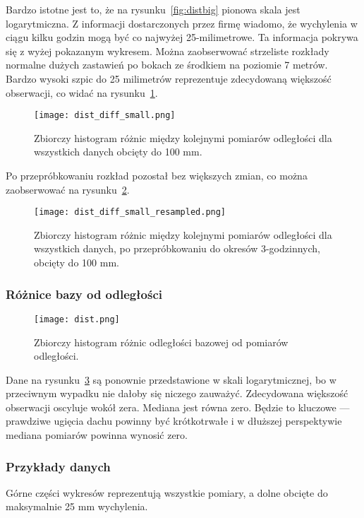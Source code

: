 Bardzo istotne jest to, że na rysunku~\ref{fig:distbig} pionowa skala jest logarytmiczna.
Z informacji dostarczonych przez firmę wiadomo, że wychylenia w ciągu kilku godzin mogą być co najwyżej 25-milimetrowe.
Ta informacja pokrywa się z wyżej pokazanym wykresem.
Można zaobserwować strzeliste rozkłady normalne dużych zastawień po bokach ze środkiem na poziomie 7 metrów.
Bardzo wysoki szpic do 25 milimetrów reprezentuje zdecydowaną większość obserwacji, co widać na rysunku~\ref{fig:diffsmall}.


\begin{figure}[h]
    \texttt{[image: dist\_diff\_small.png]}
    \caption{Zbiorczy histogram różnic między kolejnymi pomiarów odległości dla wszystkich danych obcięty do 100 mm.}
    \label{fig:diffsmall}
\end{figure}


Po przepróbkowaniu rozkład pozostał bez większych zmian, co można zaobserwować na rysunku~\ref{fig:diffsmallresampled}.
\begin{figure}[h]
    \texttt{[image: dist\_diff\_small\_resampled.png]}
    \caption{Zbiorczy histogram różnic między kolejnymi pomiarów odległości dla wszystkich danych, po przepróbkowaniu do okresów 3-godzinnych, obcięty do 100 mm.}
    \label{fig:diffsmallresampled}
\end{figure}


\subsubsection{Różnice bazy od odległości}
\begin{figure}[h]
    \texttt{[image: dist.png]}
    \caption{Zbiorczy histogram różnic odległości bazowej od pomiarów odległości.}
    \label{fig:dist}
\end{figure}


Dane na rysunku~\ref{fig:dist} są ponownie przedstawione w skali logarytmicznej, bo w przeciwnym wypadku nie dałoby się niczego zauważyć.
Zdecydowana większość obserwacji oscyluje wokół zera.
Mediana jest równa zero.
Będzie to kluczowe — prawdziwe ugięcia dachu powinny być krótkotrwałe i w dłuższej perspektywie mediana pomiarów powinna wynosić zero.
\subsubsection{Przykłady danych}\label{examples}
Górne części wykresów reprezentują wszystkie pomiary, a dolne obcięte do maksymalnie 25 mm wychylenia.


